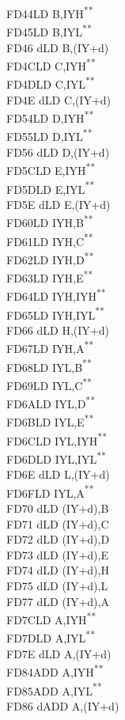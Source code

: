 \documentclass[12pt,twoside,openright,a4paper]{book}
\newcommand{\UNDOC}{\textnormal{\textsuperscript{**}}}
\begin{document}
\begin{multicols}{3}
{\begin{tabbing}
	FD44\>LD B,IYH\UNDOC\\
	FD45\>LD B,IYL\UNDOC\\
	FD46 d\>LD B,(IY+d)\\
	FD4C\>LD C,IYH\UNDOC\\
	FD4D\>LD C,IYL\UNDOC\\
	FD4E d\>LD C,(IY+d)\\
	FD54\>LD D,IYH\UNDOC\\
	FD55\>LD D,IYL\UNDOC\\
	FD56 d\>LD D,(IY+d)\\
	FD5C\>LD E,IYH\UNDOC\\
	FD5D\>LD E,IYL\UNDOC\\
	FD5E d\>LD E,(IY+d)\\
	FD60\>LD IYH,B\UNDOC\\
	FD61\>LD IYH,C\UNDOC\\
	FD62\>LD IYH,D\UNDOC\\
	FD63\>LD IYH,E\UNDOC\\
	FD64\>LD IYH,IYH\UNDOC\\
	FD65\>LD IYH,IYL\UNDOC\\
	FD66 d\>LD H,(IY+d)\\
	FD67\>LD IYH,A\UNDOC\\
	FD68\>LD IYL,B\UNDOC\\
	FD69\>LD IYL,C\UNDOC\\
	FD6A\>LD IYL,D\UNDOC\\
	FD6B\>LD IYL,E\UNDOC\\
	FD6C\>LD IYL,IYH\UNDOC\\
	FD6D\>LD IYL,IYL\UNDOC\\
	FD6E d\>LD L,(IY+d)\\
	FD6F\>LD IYL,A\UNDOC\\
	FD70 d\>LD (IY+d),B\\
	FD71 d\>LD (IY+d),C\\
	FD72 d\>LD (IY+d),D\\
	FD73 d\>LD (IY+d),E\\
	FD74 d\>LD (IY+d),H\\
	FD75 d\>LD (IY+d),L\\
	FD77 d\>LD (IY+d),A\\
	FD7C\>LD A,IYH\UNDOC\\
	FD7D\>LD A,IYL\UNDOC\\
	FD7E d\>LD A,(IY+d)\\
	FD84\>ADD A,IYH\UNDOC\\
	FD85\>ADD A,IYL\UNDOC\\
	FD86 d\>ADD A,(IY+d)\\

\end{tabbing}}
\end{multicols}
\end{document}
